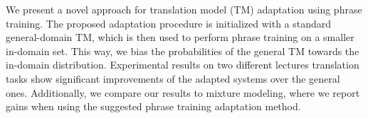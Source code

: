 We present a novel approach for translation model (TM) adaptation using phrase training.
 The proposed adaptation procedure is initialized with a standard general-domain
 TM, which is then used to perform phrase training on a smaller in-domain set. 
 This way, we bias the probabilities of the general TM towards the in-domain
 distribution.
 Experimental results on two different lectures translation tasks show
 significant improvements of the adapted systems over the general ones.
 Additionally, we compare our results to mixture modeling, where we report gains
 when using the suggested phrase training adaptation method.

